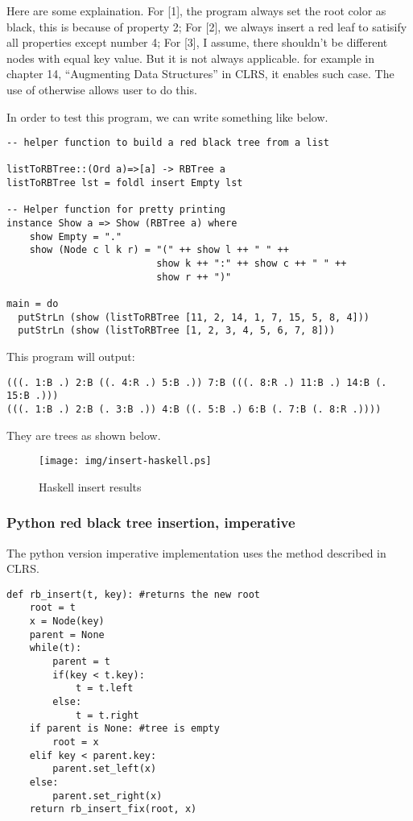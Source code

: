 \documentclass{article}
\begin{document}
Here are some explaination. For [1], the program always set the root
color as black, this is because of property 2; For [2], we always insert
a red leaf to satisify all properties except number 4; For [3], I assume, 
there shouldn't be different nodes with equal key value. But it is not always
applicable. for example in chapter 14, ``Augmenting Data Structures'' in CLRS\cite{CLRS}, it enables such case. The use of otherwise allows user to do this.

In order to test this program, we can write something like below.

\begin{lstlisting}
-- helper function to build a red black tree from a list

listToRBTree::(Ord a)=>[a] -> RBTree a
listToRBTree lst = foldl insert Empty lst

-- Helper function for pretty printing
instance Show a => Show (RBTree a) where
    show Empty = "."
    show (Node c l k r) = "(" ++ show l ++ " " ++ 
                          show k ++ ":" ++ show c ++ " " ++ 
                          show r ++ ")"

main = do
  putStrLn (show (listToRBTree [11, 2, 14, 1, 7, 15, 5, 8, 4]))
  putStrLn (show (listToRBTree [1, 2, 3, 4, 5, 6, 7, 8]))
\end{lstlisting}

This program will output:
\begin{verbatim}
(((. 1:B .) 2:B ((. 4:R .) 5:B .)) 7:B (((. 8:R .) 11:B .) 14:B (. 15:B .)))
(((. 1:B .) 2:B (. 3:B .)) 4:B ((. 5:B .) 6:B (. 7:B (. 8:R .))))
\end{verbatim}

They are trees as shown below.

\begin{figure}[htbp]
       \begin{center}
	\texttt{[image: img/insert-haskell.ps]}
        \caption{Haskell insert results} 
       \end{center}
\end{figure}

\subsubsection*{Python red black tree insertion, imperative}

The python version imperative implementation uses the method described in CLRS.

\lstset{language=Python}
\begin{lstlisting}
def rb_insert(t, key): #returns the new root
    root = t
    x = Node(key)
    parent = None
    while(t):
        parent = t
        if(key < t.key):
            t = t.left
        else:
            t = t.right
    if parent is None: #tree is empty
        root = x
    elif key < parent.key:
        parent.set_left(x)
    else:
        parent.set_right(x)
    return rb_insert_fix(root, x)
\end{lstlisting}
\end{document}
